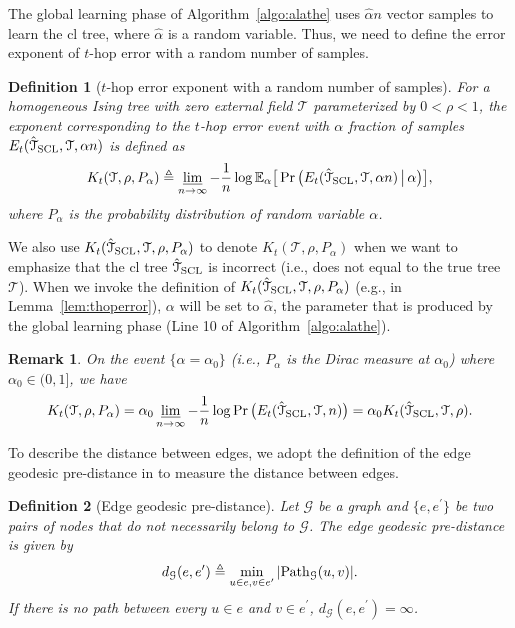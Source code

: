 \documentclass[11pt,onecolumn]{article}
\newcommand{\calG}{\mathcal{G}}
\newcommand{\calT}{\mathcal{T}}
\newcommand{\hatcalT}{\hat{\calT}}
\newcommand{\bbE}{\mathbb{E}}
\newcommand{\halpha}{\hat{\alpha}}
\newtheorem{definition}{Definition}
\newtheorem{remark}{Remark}
\begin{document}
The global learning phase of Algorithm~\ref{algo:alathe} uses $\halpha n$ vector samples to learn the \ac{cl} tree, where $\halpha$ is a random variable. Thus, we need to define the error exponent of 
$t$-hop error with a random number of samples.
\begin{definition}[$t$-hop error exponent with a random number of samples]
For a homogeneous Ising tree with zero external field $\calT$ parameterized by $0<\rho<1$, the exponent corresponding to the $t$-hop error event with $\alpha$ fraction of samples $E_{t}(\hatcalT_{{\rm SCL}},\calT,\alpha n)$ is defined as
\begin{align}
	K_{t}(\calT,\rho,P_{\alpha})\triangleq\varliminf_{n\rightarrow\infty} -\frac{1}{n}\log\bbE_{\alpha}\big[\Pr\big(E_{t}(\hatcalT_{{\rm SCL}},\calT,\alpha n)\,\big|\,\alpha \big)\big],
\end{align}
where $P_{\alpha}$ is the probability distribution of random variable $\alpha$.
\end{definition}
We also use $K _{t}(\hatcalT_{{\rm SCL}},\calT,\rho,P_{\alpha})$ to denote $K _{t}(\calT,\rho,P_{\alpha})$ when we want to emphasize that the \ac{cl} tree $\hatcalT_{{\rm SCL}}$ is incorrect (i.e., does not equal to the true tree $\calT$). When we invoke the definition of $K_t(\hatcalT_{{\rm SCL}},\calT,\rho,P_{\alpha})$ (e.g., in Lemma~\ref{lem:thoperror}), $\alpha$ will be set to $\halpha$, the parameter that is produced by the global learning phase (Line 10 of Algorithm~\ref{algo:alathe}).
\begin{remark}
	On the event $\{\alpha=\alpha_{0}\}$ (i.e., $P_\alpha$ is the Dirac measure at $\alpha_0$) where $\alpha_{0}\in(0,1]$, we have
	\begin{align}
		K _{t}(\calT,\rho,P_{\alpha})=\alpha_{0} \varliminf_{n\rightarrow\infty} -\frac{1}{n}\log\Pr\big(E_{t}(\hatcalT_{{\rm SCL}},\calT,n)\big)=\alpha_{0} K _{t}(\hatcalT_{{\rm SCL}},\calT,\rho).
	\end{align}
\end{remark}
To describe the distance between edges, we adopt the definition of the edge geodesic pre-distance in \cite{neykov2019property} 
to measure the distance between edges.
\begin{definition}[Edge geodesic pre-distance]
	Let $\calG$ be a graph and $\{e,e^{\prime}\}$ be two pairs of nodes that do not necessarily  belong to $\calG$. The {\em edge geodesic pre-distance} is given by
	\begin{align}
		d_{\calG}(e,e^{\prime})\triangleq \min_{u\in e,v\in e^{\prime}} |{\rm Path}_{\calG}(u,v)|.
	\end{align}
	If there is no path between  every $u\in e$ and $v\in e^{\prime}$, $d_{\calG}(e,e^{\prime})=\infty$.
\end{definition}
\end{document}
